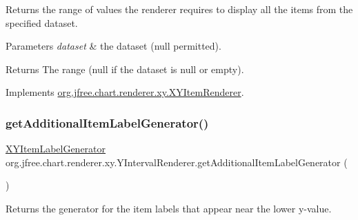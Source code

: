 Returns the range of values the renderer requires to display all the items from the specified dataset.


\begin{DoxyParams}{Parameters}
{\em dataset} & the dataset ({\ttfamily null} permitted).\\
\hline
\end{DoxyParams}
\begin{DoxyReturn}{Returns}
The range ({\ttfamily null} if the dataset is {\ttfamily null} or empty). 
\end{DoxyReturn}


Implements \mbox{\hyperlink{interfaceorg_1_1jfree_1_1chart_1_1renderer_1_1xy_1_1_x_y_item_renderer_af9ac6f440e99c73d343de7851e89496a}{org.\+jfree.\+chart.\+renderer.\+xy.\+X\+Y\+Item\+Renderer}}.

\mbox{\label{classorg_1_1jfree_1_1chart_1_1renderer_1_1xy_1_1_y_interval_renderer_aa4c177e06f92f9523a3d9b5bcd5b7cf1}} 
\subsubsection{\texorpdfstring{get\+Additional\+Item\+Label\+Generator()}{getAdditionalItemLabelGenerator()}}
{\footnotesize\ttfamily \mbox{\hyperlink{interfaceorg_1_1jfree_1_1chart_1_1labels_1_1_x_y_item_label_generator}{X\+Y\+Item\+Label\+Generator}} org.\+jfree.\+chart.\+renderer.\+xy.\+Y\+Interval\+Renderer.\+get\+Additional\+Item\+Label\+Generator (\begin{DoxyParamCaption}{ }\end{DoxyParamCaption})}

Returns the generator for the item labels that appear near the lower y-\/value.

